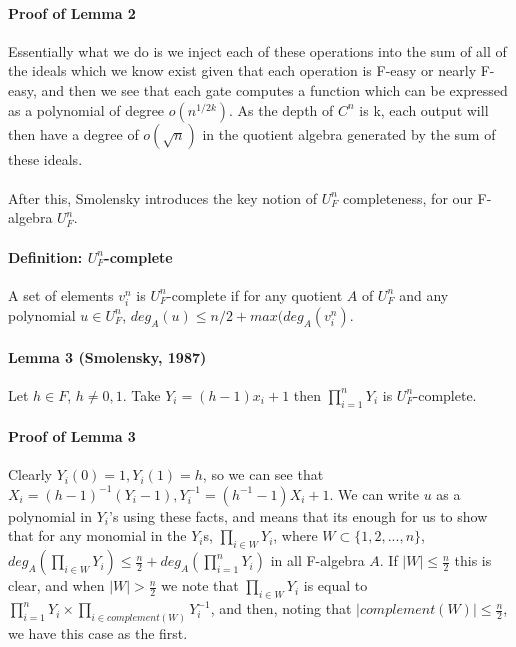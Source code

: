 \documentclass{article}
\begin{document}
\paragraph*{Proof of Lemma 2 \cite{Smolensky1987}}
  Essentially what we do is we inject each of these operations into the sum of all of the
ideals which we know exist given that each operation is F-easy or nearly F-easy, and then
we see that each gate computes a function which can be expressed as a polynomial of degree
$o(n^{1/2k})$. As the depth of $C^n$ is k, each output will then have a degree of $o(\sqrt{n})$
in the quotient algebra generated by the sum of these ideals.

\paragraph*{}
  After this, Smolensky introduces the key notion of $U_F^n$ completeness, for our F-algebra
$U_F^n$.

\paragraph*{Definition: $U_F^n$-complete}
  A set of elements $v_i^n$ is $U_F^n$-complete if for any quotient $A$ of $U_F^n$
and any polynomial $u \in U_F^n$, $deg_A(u) \leq n/2 + max(deg_A(v_i^n)$.

\paragraph*{Lemma 3 (Smolensky, 1987)}
  Let $h \in F$, $h \neq 0, 1$. Take $Y_i = (h - 1)x_i + 1$ then $\prod_{i = 1}^n Y_i$ is
$U_F^n$-complete.

\paragraph*{Proof of Lemma 3 \cite{Smolensky1987}}
  Clearly $Y_i(0) = 1, Y_i(1) = h$, so we can see that $X_i = (h - 1)^{-1}(Y_i - 1),
Y_i^{-1} = (h^{-1}-1)X_i + 1$. We can write $u$ as a polynomial in $Y_i$'s using these
facts, and means that its enough for us to show that for any monomial in the $Y_i$s,
$\prod_{i \in W} Y_i$, where $W \subset \{1, 2, ..., n\}$, $deg_A(\prod_{i \in W} Y_i)
\leq \frac{n}{2} + deg_A(\prod_{i = 1}^n Y_i)$ in all F-algebra $A$. If $|W| \leq \frac{n}{2}$
this is clear, and when $|W| > \frac{n}{2}$ we note that $\prod_{i \in W} Y_i$ is equal to
$\prod_{i = 1}^n Y_i \times \prod_{i \in complement(W)} Y_i^{-1}$, and then, noting that
$|complement(W)| \leq \frac{n}{2}$, we have this case as the first.
\end{document}

